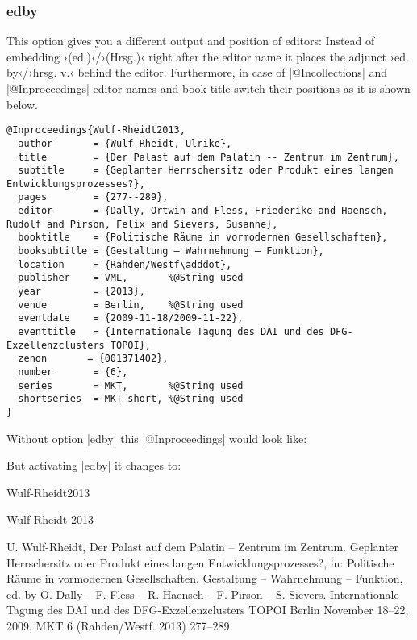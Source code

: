\documentclass[a4paper,
10pt,
greek,
french,
spanish,
italian,
ngerman,
english
]{ltxdoc}
\begin{document}
\subsubsection{edby}\label{edby}
This option gives you a different output and position of editors: 
Instead of embedding ›(ed.)‹/›(Hrsg.)‹ right after the editor name
 it places the adjunct ›ed. by‹/›hrsg. v.‹ behind the editor. 
 Furthermore, in case of |@Incollections| and |@Inproceedings| editor names and book title switch their positions as it is shown below.

\begin{lstlisting}[style=bibentry,label=Wulf-Rheidt2013,caption={{@}Inproceedings\{Wulf-Rheidt2013,…\} }]
@Inproceedings{Wulf-Rheidt2013,
  author       = {Wulf-Rheidt, Ulrike},
  title        = {Der Palast auf dem Palatin -- Zentrum im Zentrum},
  subtitle     = {Geplanter Herrschersitz oder Produkt eines langen Entwicklungsprozesses?},
  pages        = {277--289},
  editor       = {Dally, Ortwin and Fless, Friederike and Haensch, Rudolf and Pirson, Felix and Sievers, Susanne},
  booktitle    = {Politische Räume in vormodernen Gesellschaften},
  booksubtitle = {Gestaltung – Wahrnehmung – Funktion},
  location     = {Rahden/Westf\adddot},
  publisher    = VML,		%@String used
  year         = {2013},
  venue        = Berlin, 	%@String used
  eventdate    = {2009-11-18/2009-11-22},
  eventtitle   = {Internationale Tagung des DAI und des DFG-Exzellenzclusters TOPOI},
  zenon       = {001371402},
  number       = {6},
  series       = MKT,		%@String used
  shortseries  = MKT-short,	%@String used
}
\end{lstlisting}

Without option |edby| this |@Inproceedings| would look like:
 

But activating |edby| it changes to:

\begin{bibbsp}{Wulf-Rheidt2013}
\parbox[t]{2.3cm}{Wulf-Rheidt 2013} \parbox[t]{9cm}{%
U. Wulf-Rheidt, Der Palast auf dem Palatin – Zentrum im Zentrum. Geplanter Herrschersitz oder Produkt eines langen Entwicklungsprozesses?, in:  {\color{red}Politische Räume in vormodernen Gesellschaften. Gestaltung – Wahrnehmung – Funktion, ed. by O. Dally – F. Fless – R. Haensch – F. Pirson – S. Sievers}. Internationale Tagung des DAI und des DFG-Exzellenzclusters TOPOI Berlin November 18–22, 2009, MKT 6 (Rahden/Westf. 2013) 277–289}
\end{bibbsp}
 
\end{document}
